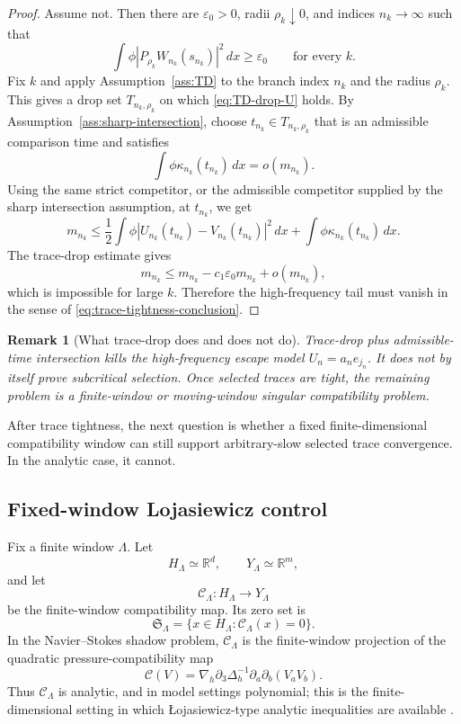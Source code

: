\documentclass[11pt]{article}
\numberwithin{equation}{section}
\newtheorem{remark}[theorem]{Remark}
\newcommand{\R}{\mathbb R}
\newcommand{\dx}{\,dx}
\newcommand{\nabh}{\nabla_h}
\newcommand{\calC}{\mathcal C}
\newcommand{\frakS}{\mathfrak S}
\begin{document}
\begin{proof}
Assume not.  Then there are \(\varepsilon_0>0\), radii \(\rho_k\downarrow0\), and indices \(n_k\to\infty\) such that
\[
\int\phi|P_{\rho_k}W_{n_k}(s_{n_k})|^2\dx\ge\varepsilon_0
\qquad\text{for every }k.
\]
Fix \(k\) and apply Assumption~\ref{ass:TD} to the branch index \(n_k\) and the radius \(\rho_k\).  This gives a drop set \(T_{n_k,\rho_k}\) on which \eqref{eq:TD-drop-U} holds.  By Assumption~\ref{ass:sharp-intersection}, choose \(t_{n_k}\in T_{n_k,\rho_k}\) that is an admissible comparison time and satisfies
\[
\int\phi\kappa_{n_k}(t_{n_k})\dx=o(m_{n_k}).
\]
Using the same strict competitor, or the admissible competitor supplied by the sharp intersection assumption, at \(t_{n_k}\), we get
\[
m_{n_k}
\le
\frac12\int\phi|U_{n_k}(t_{n_k})-V_{n_k}(t_{n_k})|^2\dx
+\int\phi\kappa_{n_k}(t_{n_k})\dx.
\]
The trace-drop estimate gives
\[
m_{n_k}\le m_{n_k}-c_1\varepsilon_0m_{n_k}+o(m_{n_k}),
\]
which is impossible for large \(k\). Therefore the high-frequency tail must vanish in the sense of \eqref{eq:trace-tightness-conclusion}.
\end{proof}

\begin{remark}[What trace-drop does and does not do]
Trace-drop plus admissible-time intersection kills the high-frequency escape model \(U_n=a_ne_{j_n}\).  It does not by itself prove subcritical selection.  Once selected traces are tight, the remaining problem is a finite-window or moving-window singular compatibility problem.
\end{remark}

\label{sec:finite-window-test}

After trace tightness, the next question is whether a fixed finite-dimensional compatibility window can still support arbitrary-slow selected trace convergence.  In the analytic case, it cannot.

\subsection{Fixed-window Lojasiewicz control}

Fix a finite window \(\Lambda\).  Let
\[
H_\Lambda\simeq\R^d,
\qquad
Y_\Lambda\simeq\R^m,
\]
and let
\[
\calC_\Lambda:H_\Lambda\to Y_\Lambda
\]
be the finite-window compatibility map.  Its zero set is
\[
\frakS_\Lambda=\{x\in H_\Lambda:\calC_\Lambda(x)=0\}.
\]
In the Navier--Stokes shadow problem, \(\calC_\Lambda\) is the finite-window projection of the quadratic pressure-compatibility map
\[
\calC(V)=\nabh\partial_3\Delta_h^{-1}\partial_a\partial_b(V_aV_b).
\]
Thus \(\calC_\Lambda\) is analytic, and in model settings polynomial; this is the finite-dimensional setting in which \L{}ojasiewicz-type analytic inequalities are available \cite{BierstoneMilman1988,Kurdyka1998,KrantzParks2002}.
\end{document}
